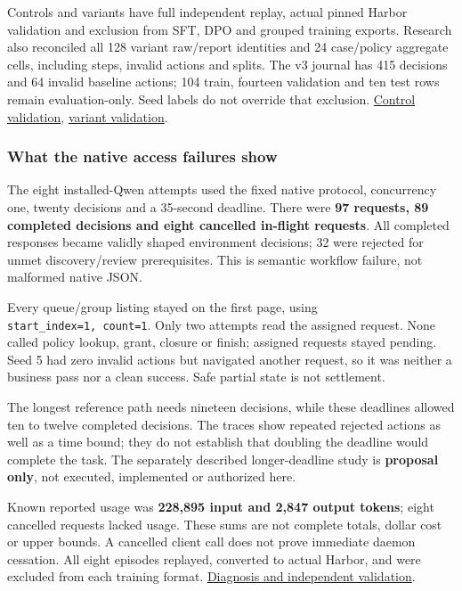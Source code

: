 \documentclass[
  11pt,
  letterpaper,
]{article}
\begin{document}
Controls and variants have full independent replay, actual pinned Harbor
validation and exclusion from SFT, DPO and grouped training exports.
Research also reconciled all 128 variant raw/report identities and 24
case/policy aggregate cells, including steps, invalid actions and
splits. The v3 journal has 415 decisions and 64 invalid baseline
actions; 104 train, fourteen validation and ten test rows remain
evaluation-only. Seed labels do not override that exclusion.
\href{../../artifacts/access-provisioning/20261010-controls-v1/independent-validation.json}{Control
validation},
\href{../../artifacts/workflow-variants/20261010-v3/independent-validation.json}{variant
validation}.

\subsubsection{What the native access failures
show}\label{what-the-native-access-failures-show}

The eight installed-Qwen attempts used the fixed native protocol,
concurrency one, twenty decisions and a 35-second deadline. There were
\textbf{97 requests, 89 completed decisions and eight cancelled
in-flight requests}. All completed responses became validly shaped
environment decisions; 32 were rejected for unmet discovery/review
prerequisites. This is semantic workflow failure, not malformed native
JSON.

Every queue/group listing stayed on the first page, using
\texttt{start\_index=1,\ count=1}. Only two attempts read the assigned
request. None called policy lookup, grant, closure or finish; assigned
requests stayed pending. Seed 5 had zero invalid actions but navigated
another request, so it was neither a business pass nor a clean success.
Safe partial state is not settlement.

The longest reference path needs nineteen decisions, while these
deadlines allowed ten to twelve completed decisions. The traces show
repeated rejected actions as well as a time bound; they do not establish
that doubling the deadline would complete the task. The separately
described longer-deadline study is \textbf{proposal only}, not executed,
implemented or authorized here.

Known reported usage was \textbf{228,895 input and 2,847 output tokens};
eight cancelled requests lacked usage. These sums are not complete
totals, dollar cost or upper bounds. A cancelled client call does not
prove immediate daemon cessation. All eight episodes replayed, converted
to actual Harbor, and were excluded from each training format.
\href{../access-native-results.md}{Diagnosis and independent
validation}.
\end{document}
